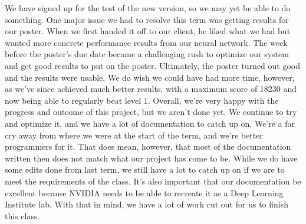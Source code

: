 \documentclass[onecolumn, draftclsnofoot,10pt, compsoc]{IEEEtran}
\begin{document}
We have signed up for the test of the new version, so we may yet be able to do something.
\newline\newline
One major issue we had to resolve this term was getting results for our poster.
When we first handed it off to our client, he liked what we had but wanted more concrete performance results from our neural network.
The week before the poster's due date became a challenging rush to optimize our system and get good results to put on the poster.
Ultimately, the poster turned out good and the results were usable. 
We do wish we could have had more time, however, as we've since achieved much better results, with a maximum score of 18230 and now being able to regularly beat level 1.
\newline\newline
Overall, we're very happy with the progress and outcome of this project, but we aren't done yet.
We continue to try and optimize it, and we have a lot of documentation to catch up on.
We're a far cry away from where we were at the start of the term, and we're better programmers for it.
That does mean, however, that most of the documentation written then does not match what our project has come to be.
While we do have some edits done from last term, we still have a lot to catch up on if we are to meet the requirements of the class.
It's also important that our documentation be excellent because NVIDIA needs to be able to recreate it as a Deep Learning Institute lab.
With that in mind, we have a lot of work cut out for us to finish this class.
\end{document}
